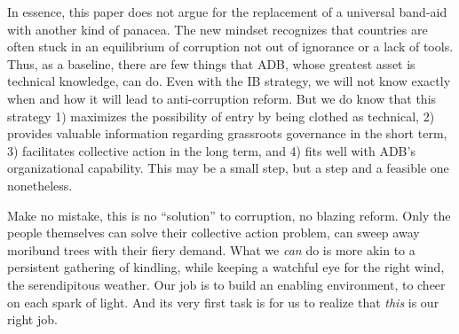 \documentclass[12pt]{article}
\begin{document}
In essence, this paper does not argue for the replacement of a universal band-aid with another kind of panacea.  The new mindset recognizes that countries are often stuck in an equilibrium of corruption not out of ignorance or a lack of tools. Thus, as a baseline, there are few things that ADB, whose greatest asset is technical knowledge, can do. Even with the IB strategy, we will not know exactly when and how it will lead to anti-corruption reform. But we do know that this strategy 1) maximizes the possibility of entry by being clothed as technical, 2) provides valuable information regarding grassroots governance in the short term, 3) facilitates collective action in the long term, and 4) fits well with ADB's organizational capability. This may be a small step, but a step and a feasible one nonetheless.

Make no mistake, this is no ``solution'' to corruption, no blazing reform. Only the people themselves can solve their collective action problem, can sweep away moribund trees with their fiery demand. What we \textit{can} do is more akin to a persistent gathering of kindling, while keeping a watchful eye for the right wind, the serendipitous weather. Our job is to build an enabling environment, to cheer on each spark of light. And its very first task is for us to realize that \textit{this} is our right job.

\newpage


\end{document}
